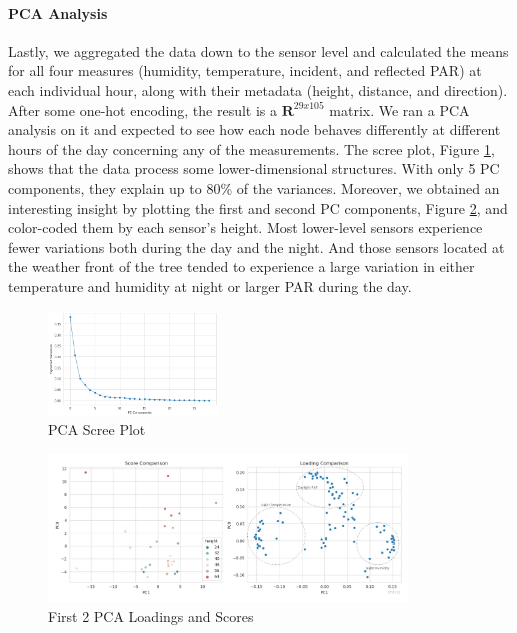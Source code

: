 \documentclass[11pt, letterpaper]{article}
\begin{document}
\paragraph{PCA Analysis}
Lastly, we aggregated the data down to the sensor level and calculated the means for all four measures (humidity, temperature, incident, and reflected PAR) at each individual hour, along with their metadata (height, distance, and direction). After some one-hot encoding, the result is a $\mathbf{R}^{29x105}$ matrix. We ran a PCA analysis on it and expected to see how each node behaves differently at different hours of the day concerning any of the measurements. The scree plot, Figure \ref{fig:pca_scree}, shows that the data process some lower-dimensional structures. With only 5 PC components, they explain up to 80\% of the variances. Moreover, we obtained an interesting insight by plotting the first and second PC components, Figure \ref{fig:pca_comp}, and color-coded them by each sensor's height. Most lower-level sensors experience fewer variations both during the day and the night. And those sensors located at the weather front of the tree tended to experience a large variation in either temperature and humidity at night or larger PAR during the day.
\begin{figure}[h!]
\centering
\includegraphics[width=0.4\textwidth]{eda_3.7.png}
\captionsetup{justification=centering}
\caption{PCA Scree Plot}
\label{fig:pca_scree}
\end{figure}
\begin{figure}[h!]
\centering
\includegraphics[width=0.85\textwidth]{eda_3.6.jpg}
\captionsetup{justification=centering}
\caption{First 2 PCA Loadings and Scores}
\label{fig:pca_comp}
\end{figure}
\end{document}

